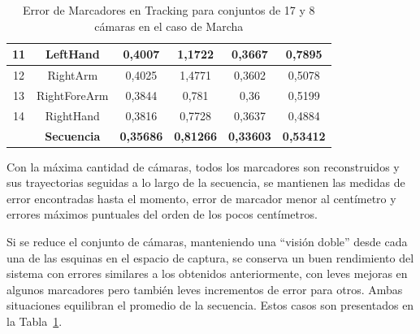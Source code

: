 \begin{table}[ht!]
{\begin{tabular}{c|c|c|c|c|c|}
\multicolumn{1}{|c|}{11} & LeftHand & 0,4007 & 1,1722 & 0,3667 & 0,7895 \\ \hline
\multicolumn{1}{|c|}{12} & RightArm & 0,4025 & 1,4771 & 0,3602 & 0,5078 \\ \hline
\multicolumn{1}{|c|}{13} & RightForeArm & 0,3844 & 0,781 & 0,36 & 0,5199 \\ \hline
\multicolumn{1}{|c|}{14} & RightHand & 0,3816 & 0,7728 & 0,3637 & 0,4884 \\ \hline
\multicolumn{1}{|c|}{\textbf{}} & \textbf{Secuencia} & \textbf{0,35686} & \textbf{0,81266} & \textbf{0,33603} & \textbf{0,53412} \\ \hline
\end{tabular}
}
\caption{Error de Marcadores en Tracking para conjuntos de 17 y 8 cámaras en el caso de Marcha}
\label{error_captura_marcha_17_8_camaras}
\end{table}

Con la máxima cantidad de cámaras, todos los marcadores son reconstruidos y sus trayectorias seguidas a lo largo de la secuencia, se mantienen las medidas de error encontradas hasta el momento, error de marcador menor al centímetro y errores máximos puntuales del orden de los pocos centímetros. 


Si se reduce el conjunto de cámaras, manteniendo una ``visión doble''  desde cada una de las esquinas en el espacio de captura, se conserva un buen rendimiento del sistema con errores similares a los obtenidos anteriormente, con leves mejoras en algunos marcadores pero también leves incrementos de error para otros. Ambas situaciones equilibran el promedio de la secuencia. Estos casos son presentados en la Tabla~\ref{error_captura_marcha_17_8_camaras}.

